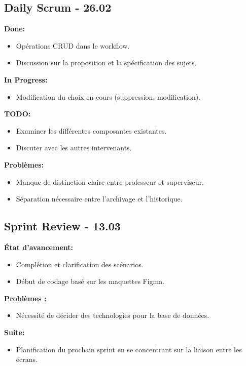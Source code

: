 \documentclass[11pt]{article}
\begin{document}
\subsection*{{\color{navy}Daily Scrum - 26.02}}
\textbf{Done:}
\begin{itemize}
  \item Opérations CRUD dans le workflow.
  \item Discussion sur la proposition et la spécification des sujets.
\end{itemize}
\textbf{In Progress:}
\begin{itemize}
  \item Modification du choix en cours (suppression, modification).
\end{itemize}
\textbf{TODO:}
\begin{itemize}
  \item Examiner les différentes composantes existantes.
  \item Discuter avec les autres intervenants.
\end{itemize}
\textbf{Problèmes:}
\begin{itemize}
  \item Manque de distinction claire entre professeur et superviseur.
  \item Séparation nécessaire entre l'archivage et l'historique.
\end{itemize}







\subsection*{{\color{navy}Sprint Review - 13.03}}
\textbf{État d'avancement:}
\begin{itemize}
  \item Complétion et clarification des scénarios.
  \item Début de codage basé sur les maquettes Figma.
\end{itemize}
\textbf{Problèmes :}
\begin{itemize}
  \item Nécessité de décider des technologies pour la base de données.
\end{itemize}
\textbf{Suite:}
\begin{itemize}
  \item Planification du prochain sprint en se concentrant sur la liaison entre les écrans.
\end{itemize}
\end{document}
